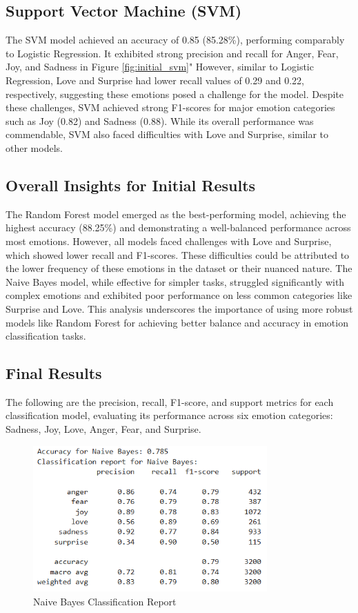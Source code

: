 \subsection{Support Vector Machine (SVM)}
The SVM model achieved an accuracy of 0.85 (85.28\%), performing comparably to Logistic Regression. It exhibited strong precision and recall for Anger, Fear, Joy, and Sadness in Figure \ref{fig:initial_svm}" However, similar to Logistic Regression, Love and Surprise had lower recall values of 0.29 and 0.22, respectively, suggesting these emotions posed a challenge for the model. Despite these challenges, SVM achieved strong F1-scores for major emotion categories such as Joy (0.82) and Sadness (0.88). While its overall performance was commendable, SVM also faced difficulties with Love and Surprise, similar to other models.

\subsection{Overall Insights for Initial Results}
The Random Forest model emerged as the best-performing model, achieving the highest accuracy (88.25\%) and demonstrating a well-balanced performance across most emotions. However, all models faced challenges with Love and Surprise, which showed lower recall and F1-scores. These difficulties could be attributed to the lower frequency of these emotions in the dataset or their nuanced nature. The Naive Bayes model, while effective for simpler tasks, struggled significantly with complex emotions and exhibited poor performance on less common categories like Surprise and Love. This analysis underscores the importance of using more robust models like Random Forest for achieving better balance and accuracy in emotion classification tasks.

       
\subsection{Final Results}
The following are the precision, recall, F1-score, and support metrics for each classification model, evaluating its performance across six emotion categories: Sadness, Joy, Love, Anger, Fear, and Surprise.

\begin{figure}[h!]
\centering
\includegraphics[width=0.8\textwidth]{images/naive_bayes_result.png}
\caption{Naive Bayes Classification Report}
\label{fig:naive_bayes}
\end{figure}

